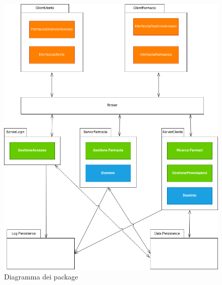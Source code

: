 \begin{figure}[h!]
    \begin{center}
        \includegraphics[width=\textwidth]{immagini/Package-progettazione.png}
        \caption{Diagramma dei package}
    \end{center}
\end{figure}

\newpage

